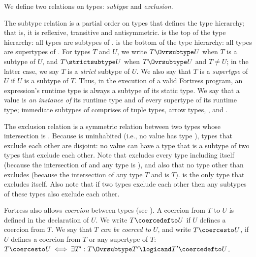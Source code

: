 We define two relations on types: \emph{subtype} and \emph{exclusion}.

The subtype relation is a partial order on types
that defines the type hierarchy;
that is,
it is reflexive, transitive and antisymmetric.
 is the top of the type hierarchy:
all types are subtypes of .
 is the bottom of the type hierarchy:
all types are supertypes of .
For types $T$ and $U$,
we write $T \Ovrsubtype U$ when $T$ is a subtype of $U$,
and $T \strictsubtype U$ when $T \Ovrsubtype U$ and $T \neq U$;
in the latter case,
we say $T$ is a \emph{strict} subtype of $U$.
We also say that $T$ is a \emph{supertype} of $U$ if $U$ is a subtype of $T$.
Thus, in the execution of a
valid Fortress program, an expression's runtime type is always a subtype of
its static type.
We say that a value is \emph{an instance of} its runtime
type and of every supertype of its runtime type; immediate subtypes of
 comprises of tuple types, arrow types, \TYP{()}, and .

The exclusion relation is a symmetric relation between two types
whose intersection is .
Because  is uninhabited
(i.e., no value has type ),
types that exclude each other are disjoint:
no value can have a type that is a subtype of two types that exclude each other.
Note that  excludes every type including itself
(because the intersection of  and any type is ),
and also that no type other than  excludes 
(because the intersection of any type $T$ and  is $T$).
 is the only type that excludes itself.
Also note that if two types exclude each other
then any subtypes of these types also exclude each other.


Fortress also allows \emph{coercion} between types
(see ).  A coercion from $T$ to $U$
is defined in the declaration of $U$.  We write $T \coercedefto U$ if
$U$ defines a coercion from $T$.  We say that $T$ \emph{can be coerced
to} $U$, and write $T \coercesto U$, if $U$ defines a coercion from
$T$ or any supertype of $T$: $T \coercesto U \iff \exists T':
T \Ovrsubtype T' \logicand T' \coercedefto U$.


